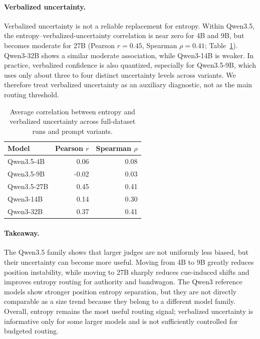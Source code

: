 \paragraph{Verbalized uncertainty.}
Verbalized uncertainty is not a reliable replacement for entropy. Within
Qwen3.5, the entropy--verbalized-uncertainty correlation is near zero for 4B
and 9B, but becomes moderate for 27B (Pearson $r=0.45$, Spearman $\rho=0.41$;
Table~\ref{tab:entropy-verbalized-correlation}). Qwen3-32B shows a similar
moderate association, while Qwen3-14B is weaker. In practice, verbalized
confidence is also quantized, especially for Qwen3.5-9B, which uses only about
three to four distinct uncertainty levels across variants. We therefore treat
verbalized uncertainty as an auxiliary diagnostic, not as the main routing
threshold.

\begin{table}[t]
\centering
\small
\setlength{\tabcolsep}{5pt}
\renewcommand{\arraystretch}{1.08}
\begin{tabular}{lrr}
\toprule
Model & Pearson $r$ & Spearman $\rho$ \\
\midrule
Qwen3.5-4B  &  0.06 & 0.08 \\
Qwen3.5-9B  & -0.02 & 0.03 \\
Qwen3.5-27B &  0.45 & 0.41 \\
Qwen3-14B   &  0.14 & 0.30 \\
Qwen3-32B   &  0.37 & 0.41 \\
\bottomrule
\end{tabular}
\caption{Average correlation between entropy and verbalized uncertainty across
full-dataset runs and prompt variants.}
\label{tab:entropy-verbalized-correlation}
\end{table}

\paragraph{Takeaway.}
The Qwen3.5 family shows that larger judges are not uniformly less biased, but
their uncertainty can become more useful. Moving from 4B to 9B greatly reduces
position instability, while moving to 27B sharply reduces cue-induced shifts
and improves entropy routing for authority and bandwagon. The Qwen3 reference
models show stronger position entropy separation, but they are not directly
comparable as a size trend because they belong to a different model family.
Overall, entropy remains the most useful routing signal; verbalized uncertainty
is informative only for some larger models and is not sufficiently controlled
for budgeted routing.
